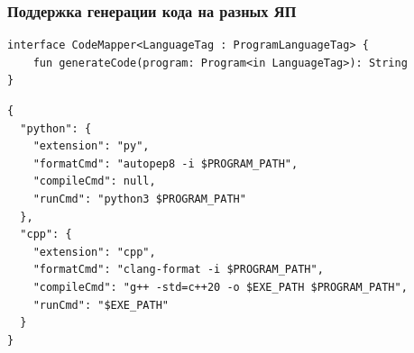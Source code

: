 \documentclass[14pt,aspectratio=169,hyperref={pdftex,unicode},xcolor=dvipsnames]{beamer}
\begin{document}
\setcounter{finalframe}{\value{framenumber}}
\begin{frame}[fragile]
    \frametitle{Поддержка генерации кода на разных ЯП}
    \begin{verbatim}
interface CodeMapper<LanguageTag : ProgramLanguageTag> {
    fun generateCode(program: Program<in LanguageTag>): String
}
    \end{verbatim}
    \begin{verbatim}
{
  "python": {
    "extension": "py",
    "formatCmd": "autopep8 -i $PROGRAM_PATH",
    "compileCmd": null,
    "runCmd": "python3 $PROGRAM_PATH"
  },
  "cpp": {
    "extension": "cpp",
    "formatCmd": "clang-format -i $PROGRAM_PATH",
    "compileCmd": "g++ -std=c++20 -o $EXE_PATH $PROGRAM_PATH",
    "runCmd": "$EXE_PATH"
  }
}
    \end{verbatim}
\end{frame}
\setcounter{framenumber}{\value{finalframe}}
\end{document}

